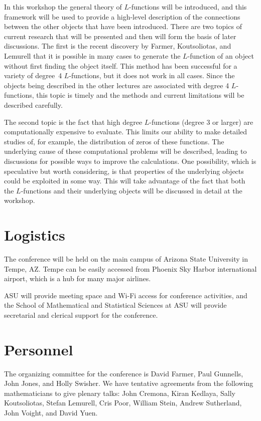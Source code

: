 \documentclass[12pt]{amsart}
\numberwithin{equation}{section}
\begin{document}
In this workshop the general theory of $L$-functions will be
introduced, and this framework will be used to provide a high-level
description of the connections between the other objects that have
been introduced.  There are two topics of current research that will
be presented and then will form the basis of later discussions.  The
first is the recent discovery by Farmer, Koutsoliotas, and Lemurell
that it is possible in many cases to generate the $L$-function of an
object without first finding the object itself.  This method has been
successful for a variety of degree~4 $L$-functions, but it does not
work in all cases.  Since the objects being described in the other
lectures are associated with degree 4 $L$-functions, this topic is
timely and the methods and current limitations will be described
carefully.

The second topic is the fact that high degree $L$-functions (degree 3
or larger) are computationally expensive to evaluate.  This limits our
ability to make detailed studies of, for example, the distribution of
zeros of these functions.  The underlying cause of these computational
problems will be described, leading to discussions for possible ways
to improve the calculations.  One possibility, which is speculative
but worth considering, is that properties of the underlying objects
could be exploited in some way.  This will take advantage of the fact
that both the $L$-functions and their underlying objects will be
discussed in detail at the workshop.

\section{Logistics}

The conference will be held on the main campus of Arizona State
University in Tempe, AZ.  Tempe can be easily accessed from Phoenix
Sky Harbor international airport, which is a hub for many major airlines.

ASU will provide meeting space and Wi-Fi access for conference
activities, and the School of Mathematical and Statistical Sciences at
ASU will provide secretarial and clerical support for the conference.

\section{Personnel}

The organizing committee for the conference is David
Farmer, Paul Gunnells, 
John Jones, and Holly Swisher.
%
We have tentative agreements from the following mathematicians to give
plenary talks:
John Cremona, Kiran Kedlaya, Sally Koutsoliotas, Stefan Lemurell, 
Cris Poor, William Stein, Andrew Sutherland, John Voight, and David Yuen.
\end{document}
